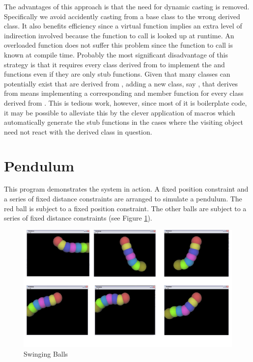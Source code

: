 The advantages of this approach is that the need for dynamic casting is
removed. Specifically we avoid accidently casting from a base
class to the wrong derived class. It also benefits efficiency since a virtual
function implies an extra level of indirection involved because the function to
call is looked up at runtime. An overloaded function does not
suffer this problem since the function to call is known at compile
time. Probably the most significant disadvantage of this strategy is that it
requires every class derived from  to implement the
 and  functions even if they are only stub
functions. Given that many classes can potentially exist that are derived from
, adding a new class, say , that derives
from  means implementing a corresponding  and
 member function for every class derived from
. This is tedious work, however, since most of it is
boilerplate code, it may be possible to alleviate this by the clever application
of macros which automatically generate the stub functions in the cases where the
visiting object need not react with the  derived class in
question.

\section{Pendulum}
This program demonstrates the system in action. A fixed position constraint and a
series of fixed distance constraints are arranged to simulate a pendulum. The
red ball is subject to a fixed position constraint. The other balls are subject
to a series of fixed distance constraints (see Figure \ref{Fig:Balls}).
\begin{figure}    
    \centering
	\includegraphics[width=1\textwidth]{Balls}    
    \caption{\label{Fig:Balls}Swinging Balls}
\end{figure}

